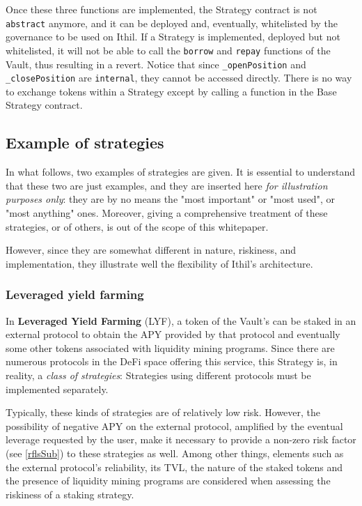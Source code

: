 \documentclass[a4paper,10 pt]{article}
\theoremstyle{definition}
\begin{document}
Once these three functions are implemented, the Strategy contract is not \verb|abstract| anymore, and it can be deployed and, eventually, whitelisted by the governance to be used on Ithil. If a Strategy is implemented, deployed but not whitelisted, it will not be able to call the \verb|borrow| and \verb|repay| functions of the Vault, thus resulting in a revert. Notice that since \verb|_openPosition| and \verb|_closePosition| are \verb|internal|, they cannot be accessed directly. There is no way to exchange tokens within a Strategy except by calling a function in the Base Strategy contract.

\subsection{Example of strategies}\label{exstrSub}

In what follows, two examples of strategies are given. It is essential to understand that these two are just examples, and they are inserted here {\it for illustration purposes only}: they are by no means the "most important" or "most used", or "most anything" ones. Moreover, giving a comprehensive treatment of these strategies, or of others, is out of the scope of this whitepaper. 

However, since they are somewhat different in nature, riskiness, and implementation, they illustrate well the flexibility of Ithil's architecture.
 
\subsubsection{Leveraged yield farming}\label{lyfSubSub}

In {\bf Leveraged Yield Farming} (LYF), a token of the Vault's can be staked in an external protocol to obtain the APY provided by that protocol and eventually some other tokens associated with liquidity mining programs. Since there are numerous protocols in the DeFi space offering this service, this Strategy is, in reality, a {\it class of strategies}: Strategies using different protocols must be implemented separately.

Typically, these kinds of strategies are of relatively low risk. However, the possibility of negative APY on the external protocol, amplified by the eventual leverage requested by the user, make it necessary to provide a non-zero risk factor (see \ref{rflsSub}) to these strategies as well. Among other things, elements such as the external protocol's reliability, its TVL, the nature of the staked tokens and the presence of liquidity mining programs are considered when assessing the riskiness of a staking strategy.
\end{document}
